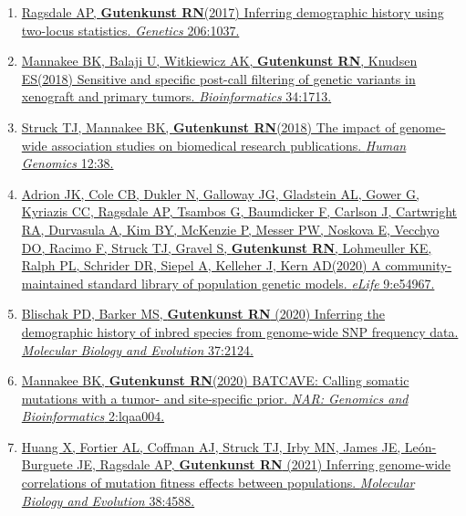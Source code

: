 \documentclass[11pt]{article}
\begin{document}
\begin{enumerate}
\item \href{https://doi.org/10.1534/genetics.117.201251}{Ragsdale AP\trainee\corresponding, \textbf{Gutenkunst RN}\corresponding (2017) Inferring demographic history using two-locus statistics. \emph{Genetics} 206:1037.}

\item \href{https://doi.org/10.1093/bioinformatics/bty010}{Mannakee BK\trainee \corresponding, Balaji U, Witkiewicz AK, \textbf{Gutenkunst RN}\corresponding, Knudsen ES\corresponding (2018)
Sensitive and specific post-call filtering of genetic variants in xenograft and primary tumors. \emph{Bioinformatics} 34:1713.}
	
\item \href{https://doi.org/10.1186/s40246-018-0172-4}{Struck TJ\trainee, Mannakee BK\trainee, \textbf{Gutenkunst RN}\corresponding (2018) The impact of genome-wide association studies on biomedical research publications. \emph{Human Genomics} 12:38.}



\item \href{https://doi.org/10.7554/eLife.54967}{Adrion JK\equal, Cole CB\equal, Dukler N\equal, Galloway JG\equal, Gladstein AL\equal, Gower G\equal, Kyriazis CC\equal, Ragsdale AP\equal, Tsambos G\equal, Baumdicker F, Carlson J, Cartwright RA, Durvasula A, Kim BY, McKenzie P, Messer PW, Noskova E, Vecchyo DO, Racimo F, Struck TJ\trainee, Gravel S, \textbf{Gutenkunst RN}, Lohmeuller KE, Ralph PL, Schrider DR, Siepel A, Kelleher J\corresponding, Kern AD\corresponding (2020) A community-maintained standard library of population genetic models. \emph{eLife} 9:e54967.}

\item \href{https://doi.org/10.1093/molbev/msaa042}{Blischak PD\trainee\corresponding, Barker MS, \textbf{Gutenkunst RN} (2020) Inferring the demographic history of inbred species from genome-wide SNP frequency data. \emph{Molecular Biology and Evolution} 37:2124.}

\item \href{https://doi.org/10.1093/nargab/lqaa004}{Mannakee BK\trainee, \textbf{Gutenkunst RN}\corresponding (2020) BATCAVE: Calling somatic mutations with a tumor- and site-specific prior. \emph{NAR: Genomics and Bioinformatics} 2:lqaa004.}


\item \href{https://doi.org/10.1093/molbev/msab162}{Huang X\trainee, Fortier AL\trainee, Coffman AJ\trainee, Struck TJ\trainee, Irby MN\trainee, James JE\trainee, Le\'on-Burguete JE\trainee, Ragsdale AP\trainee, \textbf{Gutenkunst RN}\corresponding
(2021) Inferring genome-wide correlations of mutation fitness effects between populations. \emph{Molecular Biology and Evolution} 38:4588.}


\end{enumerate}
\end{document}
